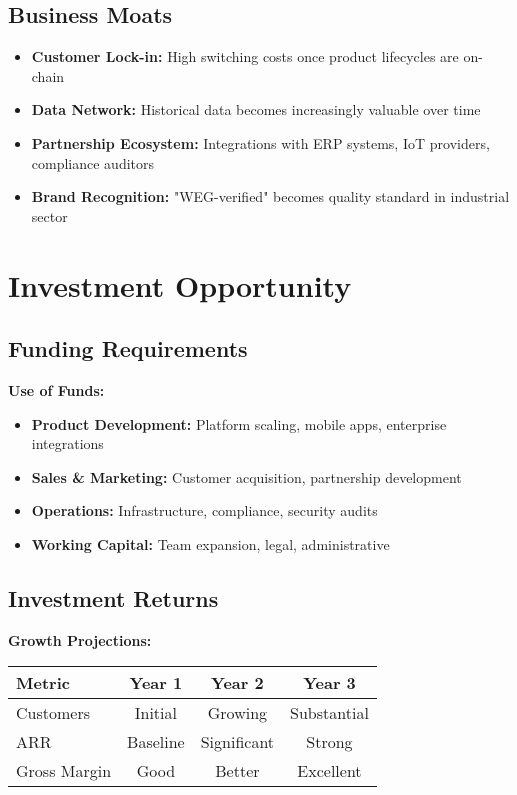 \documentclass[11pt,a4paper]{article}
\begin{document}
\subsection{Business Moats}
\begin{itemize}[leftmargin=0.5cm]
    \item \textbf{Customer Lock-in:} High switching costs once product lifecycles are on-chain
    \item \textbf{Data Network:} Historical data becomes increasingly valuable over time
    \item \textbf{Partnership Ecosystem:} Integrations with ERP systems, IoT providers, compliance auditors
    \item \textbf{Brand Recognition:} "WEG-verified" becomes quality standard in industrial sector
\end{itemize}

\section{Investment Opportunity}

\subsection{Funding Requirements}

\textbf{Use of Funds:}
\begin{itemize}[leftmargin=0.5cm]
    \item \textbf{Product Development:} Platform scaling, mobile apps, enterprise integrations
    \item \textbf{Sales \& Marketing:} Customer acquisition, partnership development
    \item \textbf{Operations:} Infrastructure, compliance, security audits
    \item \textbf{Working Capital:} Team expansion, legal, administrative
\end{itemize}

\subsection{Investment Returns}

\textbf{Growth Projections:}
\begin{center}
\begin{tabular}{|l|c|c|c|}
\hline
\textbf{Metric} & \textbf{Year 1} & \textbf{Year 2} & \textbf{Year 3} \\
\hline
Customers & Initial & Growing & Substantial \\
ARR & Baseline & Significant & Strong \\
Gross Margin & Good & Better & Excellent \\
\hline
\end{tabular}
\end{center}
\end{document}
